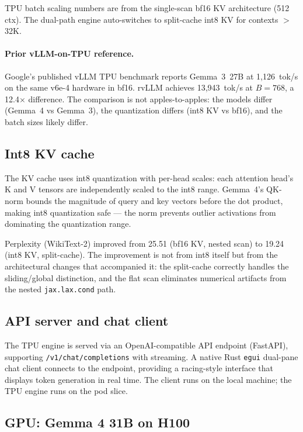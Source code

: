 \noindent TPU batch scaling numbers are from the single-scan bf16 KV
architecture (512 ctx). The dual-path engine auto-switches to
split-cache int8 KV for contexts $>$32K.

\paragraph{Prior vLLM-on-TPU reference.}
Google's published vLLM TPU benchmark reports Gemma~3~27B at
1{,}126~tok/s on the same v6e-4 hardware in bf16. rvLLM achieves
13{,}943~tok/s at $B\!=\!768$, a 12.4$\times$ difference. The
comparison is not apples-to-apples: the models differ (Gemma~4 vs
Gemma~3), the quantization differs (int8 KV vs bf16), and the batch
sizes likely differ.

\subsection{Int8 KV cache}
\label{sec:tpu_int8}

The KV cache uses int8 quantization with per-head scales: each
attention head's K and V tensors are independently scaled to the int8
range. Gemma~4's QK-norm bounds the magnitude of query and key vectors
before the dot product, making int8 quantization safe --- the norm
prevents outlier activations from dominating the quantization range.

Perplexity (WikiText-2) improved from 25.51 (bf16 KV, nested scan) to
19.24 (int8 KV, split-cache). The improvement is not from int8 itself
but from the architectural changes that accompanied it: the split-cache
correctly handles the sliding/global distinction, and the flat scan
eliminates numerical artifacts from the nested \texttt{jax.lax.cond}
path.

\subsection{API server and chat client}

The TPU engine is served via an OpenAI-compatible API endpoint
(FastAPI), supporting \texttt{/v1/chat/completions} with streaming.
A native Rust \texttt{egui} dual-pane chat client connects to the
endpoint, providing a racing-style interface that displays token
generation in real time. The client runs on the local machine; the
TPU engine runs on the pod slice.

\subsection{GPU: Gemma 4 31B on H100}
\label{sec:gpu-gemma4}

